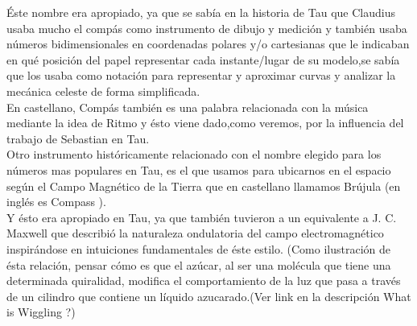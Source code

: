 \documentclass[preview]{standalone}
\begin{document}
\begin{center}
Éste nombre era apropiado, ya que  se sabía en la historia de Tau que Claudius usaba mucho el compás como instrumento de dibujo y medición y también usaba números bidimensionales en coordenadas polares y/o cartesianas que le indicaban en qué posición del papel representar cada instante/lugar de su modelo,se sabía que los usaba como notación para representar y aproximar curvas y analizar la mecánica celeste  de forma simplificada. 
$$ $$ 
En castellano, Compás  también es una palabra relacionada con la música mediante la idea de Ritmo  y ésto viene dado,como veremos, por la influencia del trabajo de Sebastian  en Tau.
$$ $$ 
Otro instrumento históricamente relacionado con el nombre elegido para los números mas populares en Tau, es el que usamos para ubicarnos en el espacio según el Campo Magnético de la Tierra que en castellano  llamamos Brújula (en inglés es Compass ).  
$$ $$ 
Y ésto era apropiado en Tau, ya que también tuvieron a un equivalente a J. C. Maxwell que describió la naturaleza ondulatoria del campo electromagnético inspirándose en intuiciones fundamentales de éste estilo. (Como ilustración de ésta relación, pensar cómo  es que el azúcar, al ser una molécula que tiene una determinada quiralidad, modifica el comportamiento de la luz  que pasa a través de un cilindro que contiene un líquido azucarado.(Ver  link en la descripción What is Wiggling ?)
\end{center}
\end{document}
